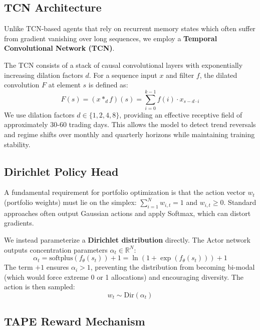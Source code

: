 \subsection{TCN Architecture}

Unlike TCN-based agents that rely on recurrent memory states which often suffer from gradient vanishing over long sequences, we employ a \textbf{Temporal Convolutional Network (TCN)}.

The TCN consists of a stack of causal convolutional layers with exponentially increasing dilation factors $d$. For a sequence input $x$ and filter $f$, the dilated convolution $F$ at element $s$ is defined as:
\begin{equation}
    F(s) = (x *_d f)(s) = \sum_{i=0}^{k-1} f(i) \cdot x_{s - d \cdot i}
\end{equation}
We use dilation factors $d \in \{1, 2, 4, 8\}$, providing an effective receptive field of approximately 30-60 trading days. This allows the model to detect trend reversals and regime shifts over monthly and quarterly horizons while maintaining training stability.

\subsection{Dirichlet Policy Head}

A fundamental requirement for portfolio optimization is that the action vector $w_t$ (portfolio weights) must lie on the simplex: $\sum_{i=1}^N w_{i,t} = 1$ and $w_{i,t} \ge 0$.
Standard approaches often output Gaussian actions and apply Softmax, which can distort gradients.

We instead parameterize a \textbf{Dirichlet distribution} directly. The Actor network outputs concentration parameters $\alpha_t \in \mathbb{R}^N$:
\begin{equation}
    \alpha_t = \text{softplus}(f_{\theta}(s_t)) + 1 = \ln(1 + \exp(f_{\theta}(s_t))) + 1
\end{equation}
The term $+1$ ensures $\alpha_i > 1$, preventing the distribution from becoming bi-modal (which would force extreme 0 or 1 allocations) and encouraging diversity. The action is then sampled:
\begin{equation}
    w_t \sim \text{Dir}(\alpha_t)
\end{equation}

\subsection{TAPE Reward Mechanism}

